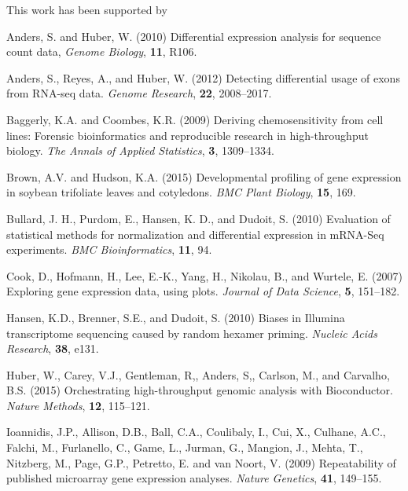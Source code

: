 \documentclass{bioinfo}
\begin{document}
This work has been supported by

\begin{thebibliography}{}


Anders, S. and Huber, W. (2010) Differential expression analysis for sequence count data, {\it Genome Biology}, {\bf 11}, R106.

Anders, S., Reyes, A., and Huber, W. (2012) Detecting differential usage of exons from RNA-seq data. {\it Genome Research}, {\bf 22}, 2008--2017.

Baggerly, K.A. and Coombes, K.R. (2009) Deriving chemosensitivity from cell lines: Forensic bioinformatics and reproducible research in high-throughput biology. {\it The Annals of Applied Statistics}, {\bf 3}, 1309--1334.

Brown, A.V. and Hudson, K.A. (2015) Developmental profiling of gene expression in soybean trifoliate leaves and cotyledons. {\it BMC Plant Biology}, {\bf 15}, 169.

Bullard, J. H., Purdom, E., Hansen, K. D., and Dudoit, S. (2010) Evaluation of statistical methods for normalization and differential expression in mRNA-Seq experiments. {\it BMC Bioinformatics}, {\bf 11}, 94.

Cook, D., Hofmann, H., Lee, E.-K., Yang, H., Nikolau, B., and Wurtele, E. (2007) Exploring gene expression data, using plots. {\it Journal of Data Science}, {\bf 5}, 151--182.

Hansen, K.D., Brenner, S.E., and Dudoit, S. (2010) Biases in Illumina transcriptome sequencing caused by random hexamer priming. {\it Nucleic Acids Research}, {\bf 38}, e131.

Huber, W., Carey, V.J., Gentleman, R,, Anders, S,, Carlson, M., and Carvalho, B.S. (2015) Orchestrating high-throughput genomic analysis with Bioconductor. {\it Nature Methods}, {\bf 12}, 115--121.

Ioannidis, J.P., Allison, D.B., Ball, C.A., Coulibaly, I., Cui, X., Culhane, A.C., Falchi, M., Furlanello, C., Game, L., Jurman, G., Mangion, J., Mehta, T., Nitzberg, M., Page, G.P., Petretto, E. and van Noort, V. (2009) Repeatability of published microarray gene expression analyses. {\it Nature Genetics}, {\bf 41}, 149--155.


\end{thebibliography}
\end{document}
